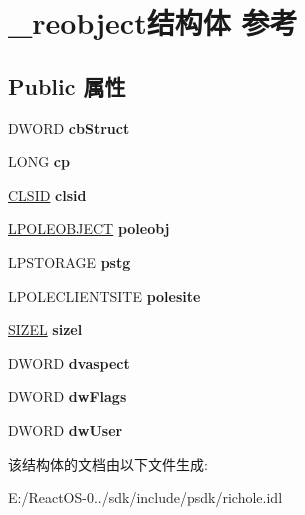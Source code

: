 \hypertarget{struct__reobject}{}\section{\+\_\+reobject结构体 参考}
\label{struct__reobject}
\subsection*{Public 属性}
\begin{DoxyCompactItemize}
\item 
\mbox{\label{struct__reobject_a9aada0f4793fe0a993caa569e74c2f3c}} 
D\+W\+O\+RD {\bfseries cb\+Struct}
\item 
\mbox{\label{struct__reobject_a9bd3a50c1401249da3e3e9ce9bbd3d68}} 
L\+O\+NG {\bfseries cp}
\item 
\mbox{\label{struct__reobject_a28fa8169fe7165edcc0dc5b242f8d608}} 
\hyperlink{struct___i_i_d}{C\+L\+S\+ID} {\bfseries clsid}
\item 
\mbox{\label{struct__reobject_a80ff04a345b75f50599b3d9b8ff08692}} 
\hyperlink{struct___o_l_e_o_b_j_e_c_t}{L\+P\+O\+L\+E\+O\+B\+J\+E\+CT} {\bfseries poleobj}
\item 
\mbox{\label{struct__reobject_a6b09a8a0787ae959f1197b703457e024}} 
L\+P\+S\+T\+O\+R\+A\+GE {\bfseries pstg}
\item 
\mbox{\label{struct__reobject_a99eaf2aa0e7ee9782efaf81f42064e60}} 
L\+P\+O\+L\+E\+C\+L\+I\+E\+N\+T\+S\+I\+TE {\bfseries polesite}
\item 
\mbox{\label{struct__reobject_aba58504e0130393d90216b3b59e4d168}} 
\hyperlink{structtag_s_i_z_e}{S\+I\+Z\+EL} {\bfseries sizel}
\item 
\mbox{\label{struct__reobject_a97c6bbb6c5d117e0d5938fa832a46b3f}} 
D\+W\+O\+RD {\bfseries dvaspect}
\item 
\mbox{\label{struct__reobject_a4ddd205a3ca1431da17075be681413be}} 
D\+W\+O\+RD {\bfseries dw\+Flags}
\item 
\mbox{\label{struct__reobject_a10cc32e65cf3da62c2cb4cb2722b4bee}} 
D\+W\+O\+RD {\bfseries dw\+User}
\end{DoxyCompactItemize}


该结构体的文档由以下文件生成\+:\begin{DoxyCompactItemize}
\item 
E\+:/\+React\+O\+S-\/0../sdk/include/psdk/richole.\+idl\end{DoxyCompactItemize}
